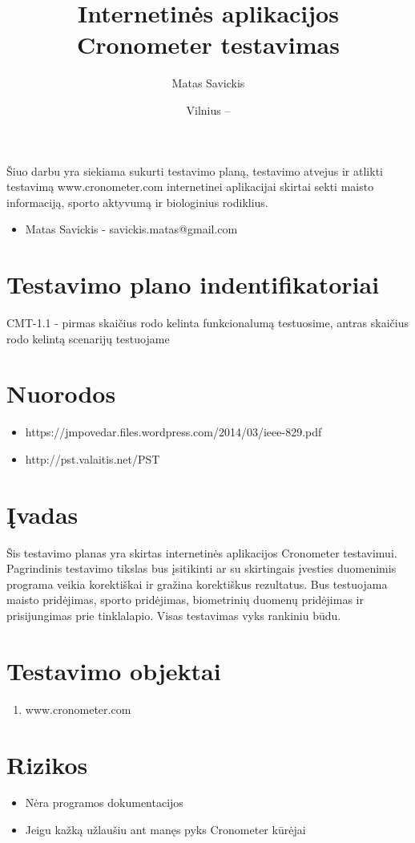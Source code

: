 \documentclass[oneside]{VUMIFPSkursinis}
\title{Internetinės aplikacijos Cronometer testavimas}
\author{Matas Savickis}
\date{Vilnius – \the\year}
\begin{document}
\maketitle

Šiuo darbu yra siekiama sukurti testavimo planą, testavimo atvejus ir atlikti testavimą www.cronometer.com  internetinei aplikacijai skirtai sekti maisto informaciją, sporto aktyvumą ir biologinius rodiklius.

\begin{itemize}
	\item{Matas Savickis - savickis.matas@gmail.com}
\end{itemize}

\tableofcontents

\section{Testavimo plano indentifikatoriai} CMT-1.1 - pirmas skaičius rodo kelinta funkcionalumą testuosime, antras skaičius rodo kelintą scenarijų testuojame
\section{Nuorodos}
	\begin{itemize}
		\item{https://jmpovedar.files.wordpress.com/2014/03/ieee-829.pdf}
		\item{http://pst.valaitis.net/PST}
	\end{itemize}
\section{Įvadas}
	Šis testavimo planas yra skirtas internetinės aplikacijos Cronometer testavimui. Pagrindinis testavimo tikslas bus įsitikinti ar su skirtingais įvesties duomenimis programa veikia korektiškai ir gražina korektiškus rezultatus. Bus testuojama maisto pridėjimas, sporto pridėjimas, biometrinių duomenų pridėjimas ir prisijungimas prie tinklalapio. Visas testavimas vyks rankiniu būdu.

\section{Testavimo objektai}
	\begin{enumerate}
		\item{www.cronometer.com}
	\end{enumerate}

\section{Rizikos}
	\begin{itemize}
		\item{Nėra programos dokumentacijos}
		\item{Jeigu kažką užlaušiu ant manęs pyks Cronometer kūrėjai}
	\end{itemize}
\end{document}
